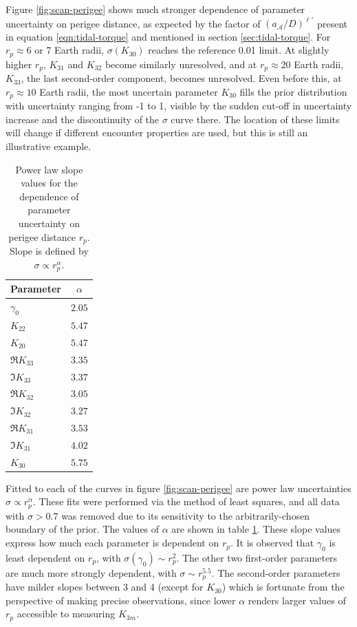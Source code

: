 \documentclass[fleqn,usenatbib]{mnras}
\begin{document}
Figure \ref{fig:scan-perigee} shows much stronger dependence of parameter uncertainty on perigee distance, as expected by the factor of $(a_\mathcal{A}/D)^{\ell'}$ present in equation \ref{eqn:tidal-torque} and mentioned in section \ref{sec:tidal-torque}. For $r_p \approx 6$ or 7 Earth radii, $\sigma(K_{30})$ reaches the reference 0.01 limit. At slightly higher $r_p$, $K_{31}$ and $K_{32}$ become similarly unresolved, and at $r_p \approx 20$ Earth radii, $K_{33}$, the last second-order component, becomes unresolved. Even before this, at $r_p \approx 10$ Earth radii, the most uncertain parameter $K_{30}$ fills the prior distribution with uncertainty ranging from -1 to 1, visible by the sudden cut-off in uncertainty increase and the discontinuity of the $\sigma$ curve there. The location of these limits will change if different encounter properties are used, but this is still an illustrative example.

\begin{table}
  \centering
  \begin{tabular}{l|c}
    \hline
    Parameter & $\alpha$ \\ \hline
    $\gamma_0$ & $2.05$ \\
    $K_{22}$ & $5.47$ \\
    $K_{20}$ & $5.47$ \\ \hline
    $\Re K_{33}$ & $3.35$ \\
    $\Im K_{33}$ & $3.37$ \\
    $\Re K_{32}$ & $3.05$ \\
    $\Im K_{32}$ & $3.27$ \\
    $\Re K_{31}$ & $3.53$ \\
    $\Im K_{31}$ & $4.02$ \\
    $K_{30}$ & $5.75$ \\ \hline
  \end{tabular}
  \caption{Power law slope values for the dependence of parameter uncertainty on perigee distance $r_p$. Slope is defined by $\sigma \propto r_p^\alpha$.}
  \label{tab:scan-perigee-alpha}
\end{table}

Fitted to each of the curves in figure \ref{fig:scan-perigee} are power law uncertainties $\sigma \propto r_p^\alpha$. These fits were performed via the method of least squares, and all data with $\sigma > 0.7$ was removed due to its sensitivity to the arbitrarily-chosen boundary of the prior. The values of $\alpha$ are shown in table \ref{tab:scan-perigee-alpha}. These slope values express how much each parameter is dependent on $r_p$. It is observed that $\gamma_0$ is least dependent on $r_p$, with $\sigma(\gamma_0) \sim r_p^2$. The other two first-order parameters are much more strongly dependent, with $\sigma \sim r_p^{5.5}$. The second-order parameters have milder slopes between 3 and 4 (except for $K_{30}$) which is fortunate from the perspective of making precise observations, since lower $\alpha$ renders larger values of $r_p$ accessible to measuring $K_{3m}$.
\end{document}
